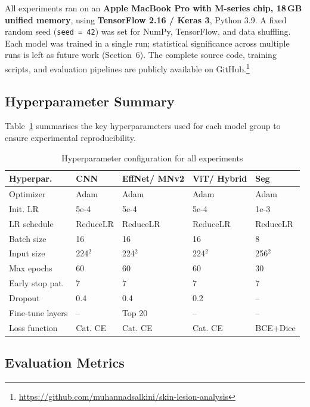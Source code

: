 \documentclass[10pt,twocolumn]{article}
\begin{document}
All experiments ran on an \textbf{Apple MacBook Pro with M-series chip,
18\,GB unified memory}, using \textbf{TensorFlow 2.16 / Keras 3}, Python 3.9.
A fixed random seed (\texttt{seed = 42}) was set for NumPy, TensorFlow, and
data shuffling. Each model was trained in a single run; statistical
significance across multiple runs is left as future work (Section~6).
The complete source code, training scripts, and evaluation pipelines are
publicly available on GitHub.\footnote{\url{https://github.com/muhannadsalkini/skin-lesion-analysis}}

\subsection{Hyperparameter Summary}

Table~\ref{tab:hyperparams} summarises the key hyperparameters used for each model group to ensure experimental reproducibility.

\begin{table}[htbp]
\centering
\caption{Hyperparameter configuration for all experiments}
\label{tab:hyperparams}
\small
\begin{tabular}{p{2.0cm}p{1.3cm}p{1.3cm}p{1.3cm}p{0.6cm}}
\toprule
\textbf{Hyperpar.} & \textbf{CNN} & \textbf{EffNet/ MNv2} & \textbf{ViT/ Hybrid} & \textbf{Seg} \\
\midrule
Optimizer        & Adam     & Adam     & Adam     & Adam \\
Init. LR         & 5e-4     & 5e-4     & 5e-4     & 1e-3 \\
LR schedule      & ReduceLR & ReduceLR & ReduceLR & ReduceLR \\
Batch size       & 16       & 16       & 16       & 8 \\
Input size       & 224$^2$  & 224$^2$  & 224$^2$  & 256$^2$ \\
Max epochs       & 60       & 60       & 60       & 30 \\
Early stop pat.  & 7        & 7        & 7        & 7 \\
Dropout          & 0.4      & 0.4      & 0.2      & -- \\
Fine-tune layers & --       & Top 20   & --       & -- \\
Loss function    & Cat. CE  & Cat. CE  & Cat. CE  & BCE+Dice \\
\bottomrule
\end{tabular}
\end{table}

\subsection{Evaluation Metrics}
\end{document}

